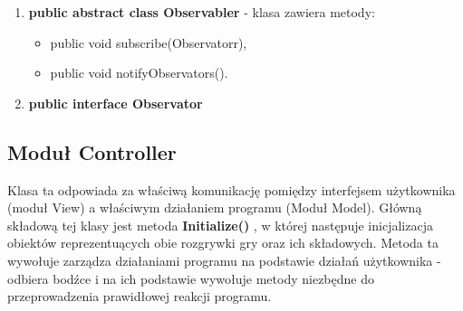 \documentclass[10pt, oneside]{article}
\begin{document}
\begin{enumerate}
	\begin {itemize}
	 \item   public int getRows (),
   	\item  public void setRows(int),
   	\item  public int getColumns(),
   	\item  public void setColumns(int),
   	\item  public double getCellSize(),
   	\item  public void setCellSize(double),
   	\item public Cell.State[] getCellsStates(),
    	\item public void setCellsStates(Cell.State[),
   	\item  public int getNumberOfCells(),
    	\item public void setNumberOfCells(int),
    	\item public Cell[] getCellsBoard(),
   	\item  public Cell getCellsBoard(int),
	\item public void setCellsBoard(Cell[]),
	\end {itemize}


Klasy dziedziczące po tej klasie:
\begin {enumerate}
	\item \textbf golCells - klasa dla wariantu gry Game of Life,
	\item \textbf wwCells - klasa dla wariantu gry Wireworld.
\end {enumerate}

\item  \textbf{public abstract class Observabler} - klasa zawiera metody:
	\begin {itemize}
	\item public void subscribe(Observatorr),
	\item public void notifyObservators().
	\end {itemize}

\item  \textbf{public interface Observator}

\end{enumerate}




\subsection {Moduł Controller}
Klasa ta odpowiada za właściwą komunikację pomiędzy interfejsem użytkownika (moduł View) a właściwym działaniem programu (Moduł Model).
			Główną składową tej klasy jest metoda \textbf {Initialize()} ,  w której następuje inicjalizacja obiektów reprezentuących obie rozgrywki gry oraz ich składowych. Metoda ta wywołuje zarządza działaniami programu na podstawie działań użytkownika - odbiera bodźce i na ich podstawie wywołuje metody niezbędne do przeprowadzenia prawidłowej reakcji programu.
\end{document}
